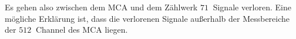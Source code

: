 Es gehen also zwischen dem MCA und dem Zählwerk $\SI{71}{}$ Signale verloren.
Eine mögliche Erklärung ist, dass die verlorenen Signale außerhalb der Messbereiche der $\SI{512}{}$ Channel des MCA liegen.
